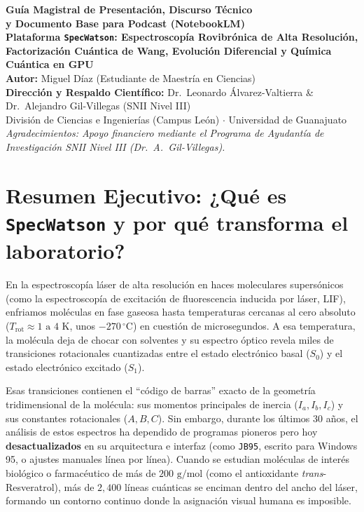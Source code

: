 \documentclass[11pt,letterpaper]{article}
\begin{document}
\begin{center}
    {\LARGE\bfseries\color{ugblue} Guía Magistral de Presentación, Discurso Técnico\\y Documento Base para Podcast (NotebookLM)}\\[0.35cm]
    {\large\bfseries Plataforma \texttt{SpecWatson}: Espectroscopía Rovibrónica de Alta Resolución,\\Factorización Cuántica de Wang, Evolución Diferencial y Química Cuántica en GPU}\\[0.35cm]
    {\normalsize \textbf{Autor:} Miguel Díaz (Estudiante de Maestría en Ciencias)}\\[0.1cm]
    {\normalsize \textbf{Dirección y Respaldo Científico:} Dr.\ Leonardo Álvarez-Valtierra \& Dr.\ Alejandro Gil-Villegas (SNII Nivel III)}\\[0.1cm]
    {\small División de Ciencias e Ingenierías (Campus León) $\cdot$ Universidad de Guanajuato}\\[0.2cm]
    {\footnotesize \textit{Agradecimientos: Apoyo financiero mediante el Programa de Ayudantía de Investigación SNII Nivel III (Dr.\ A.\ Gil-Villegas).}}
\end{center}

\vspace{0.3cm}

\section{Resumen Ejecutivo: ¿Qué es \texttt{SpecWatson} y por qué transforma el laboratorio?}

En la espectroscopía láser de alta resolución en haces moleculares supersónicos (como la espectroscopía de excitación de fluorescencia inducida por láser, LIF), enfriamos moléculas en fase gaseosa hasta temperaturas cercanas al cero absoluto ($T_{\text{rot}} \approx 1\text{ a }4\text{ K}$, unos $-270\,^\circ\text{C}$) en cuestión de microsegundos. A esa temperatura, la molécula deja de chocar con solventes y su espectro óptico revela miles de transiciones rotacionales cuantizadas entre el estado electrónico basal ($S_0$) y el estado electrónico excitado ($S_1$).

Esas transiciones contienen el ``código de barras'' exacto de la geometría tridimensional de la molécula: sus momentos principales de inercia ($I_a, I_b, I_c$) y sus constantes rotacionales ($A, B, C$). Sin embargo, durante los últimos 30 años, el análisis de estos espectros ha dependido de programas pioneros pero hoy \textbf{desactualizados} en su arquitectura e interfaz (como \texttt{JB95}, escrito para Windows 95, o ajustes manuales línea por línea). Cuando se estudian moléculas de interés biológico o farmacéutico de más de $200\text{ g/mol}$ (como el antioxidante \textit{trans}-Resveratrol), más de $2,400$ líneas cuánticas se enciman dentro del ancho del láser, formando un contorno continuo donde la asignación visual humana es imposible.
\end{document}
